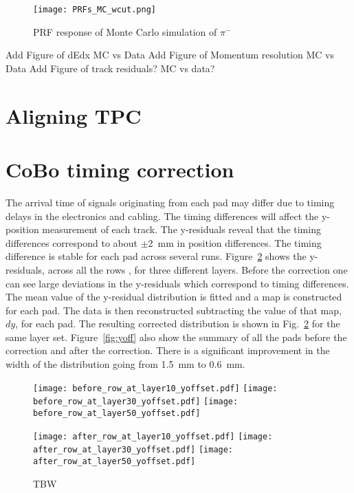 \begin{figure}[!htb]
         \centering
         \texttt{[image: PRFs\_MC\_wcut.png]}
         \caption{PRF response of Monte Carlo simulation of $\pi^-$}
         \label{fig:prfpimMC}
\end{figure}


Add Figure of dEdx MC vs Data
Add Figure of Momentum resolution MC vs Data
Add Figure of track residuals? MC vs data?


\section{Aligning TPC}




\section{CoBo timing correction}

The arrival time of signals originating from each pad may differ due to timing delays in the electronics and cabling. The timing differences will affect the y-position measurement of each track. The y-residuals reveal that the timing differences correspond to about $\pm$\SI{2}{\milli\metre} in position differences. The timing difference is stable for each pad across several runs. Figure~\ref{fig:coboCorr} shows the y-residuals, across all the rows , for three different layers. Before the correction one can see large deviations in the y-residuals which correspond to timing differences. The mean value of the y-residual distribution is fitted and a map is constructed for each pad. The data is then reconstructed subtracting the value of that map, $dy$, for each pad. The resulting corrected distribution is shown in Fig.~\ref{fig:coboCorr} for the same layer set. Figure~\ref{fig:yoff} also show the summary of all the pads before the correction and after the correction. There is a significant improvement in the width of the distribution going from \SI{1.5}{\milli\metre} to \SI{0.6}{\milli\metre}. 

\begin{figure}[!htb]
  \begin{center}
    \texttt{[image: before\_row\_at\_layer10\_yoffset.pdf]}
    \texttt{[image: before\_row\_at\_layer30\_yoffset.pdf]}
    \texttt{[image: before\_row\_at\_layer50\_yoffset.pdf]}
 
    \texttt{[image: after\_row\_at\_layer10\_yoffset.pdf]}
    \texttt{[image: after\_row\_at\_layer30\_yoffset.pdf]}
    \texttt{[image: after\_row\_at\_layer50\_yoffset.pdf]}
 
    \caption{TBW\label{TBD}}
  \end{center}
  \label{fig:coboCorr}
\end{figure}



